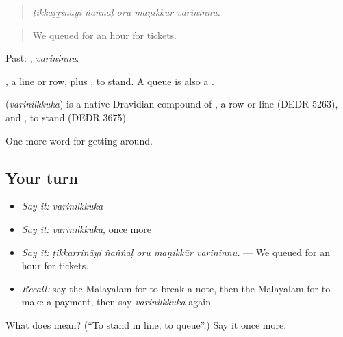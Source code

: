 \begin{quote}
\emph{ṭikkaṟṟināyi ñaṅṅaḷ oru maṇikkūr varininnu.}
\end{quote}

\begin{quote}
We queued for an hour for tickets.
\end{quote}

Past: , \emph{varininnu}.

, a line or row, plus , to stand. A queue is also a .

\begin{cousinweb}
\textbf{} (\emph{varinilkkuka}) is a native Dravidian compound of , a row or line (DEDR 5263), and , to stand (DEDR 3675).
\end{cousinweb}

\begin{grammarlens}[title={What you've built}]
One more word for getting around.
\end{grammarlens}

\subsection*{Your turn}
\begin{itemize}
\raggedright
  \item \emph{Say it:} \emph{varinilkkuka}
  \item \emph{Say it:} \emph{varinilkkuka}, once more
  \item \emph{Say it:} \emph{ṭikkaṟṟināyi ñaṅṅaḷ oru maṇikkūr varininnu.} — We queued for an hour for tickets.
  \item \emph{Recall:} say the Malayalam for to break a note, then the Malayalam for to make a payment, then say \emph{varinilkkuka} again
\end{itemize}

\begin{tcolorbox}[breakable,colback=teal!4,colframe=teal!35!black,title={Before you move on}]
What does  mean? (\textquotedblleft{}To stand in line; to queue\textquotedblright{}.) Say it once more.
\end{tcolorbox}
